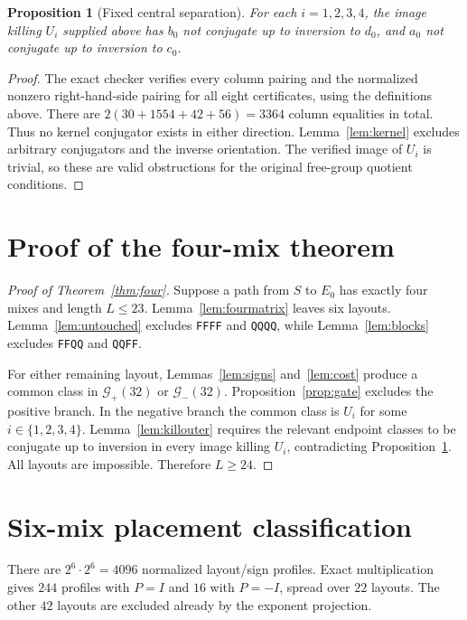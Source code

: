 \documentclass[11pt,a4paper]{article}
\newtheorem{proposition}[theorem]{Proposition}
\theoremstyle{definition}\newtheorem{definition}[theorem]{Definition}
\theoremstyle{remark}\newtheorem{remark}[theorem]{Remark}
\newcommand{\word}[1]{\texttt{#1}}
\begin{document}
\begin{proposition}[Fixed central separation]\label{prop:central}
For each $i=1,2,3,4$, the image killing $U_i$ supplied above has $b_0$ not conjugate up to inversion to $d_0$, and $a_0$ not conjugate up to inversion to $c_0$.
\end{proposition}
\begin{proof}
The exact checker verifies every column pairing and the normalized nonzero right-hand-side pairing for all eight certificates, using the definitions above. There are $2(30+1554+42+56)=3364$ column equalities in total. Thus no kernel conjugator exists in either direction. Lemma~\ref{lem:kernel} excludes arbitrary conjugators and the inverse orientation. The verified image of $U_i$ is trivial, so these are valid obstructions for the original free-group quotient conditions.
\end{proof}

\section{Proof of the four-mix theorem}\label{sec:fourproof}
\begin{proof}[Proof of Theorem~\ref{thm:four}]
Suppose a path from $S$ to $E_0$ has exactly four mixes and length $L\le23$. Lemma~\ref{lem:fourmatrix} leaves six layouts. Lemma~\ref{lem:untouched} excludes \word{FFFF} and \word{QQQQ}, while Lemma~\ref{lem:blocks} excludes \word{FFQQ} and \word{QQFF}.

For either remaining layout, Lemmas~\ref{lem:signs} and~\ref{lem:cost} produce a common class in $\mathcal G_+(32)$ or $\mathcal G_-(32)$. Proposition~\ref{prop:gate} excludes the positive branch. In the negative branch the common class is $U_i$ for some $i\in\{1,2,3,4\}$. Lemma~\ref{lem:killouter} requires the relevant endpoint classes to be conjugate up to inversion in every image killing $U_i$, contradicting Proposition~\ref{prop:central}. All layouts are impossible. Therefore $L\ge24$.
\end{proof}

\section{Six-mix placement classification}\label{sec:sixproof}
There are $2^6\cdot2^6=4096$ normalized layout/sign profiles. Exact multiplication gives $244$ profiles with $P=I$ and $16$ with $P=-I$, spread over $22$ layouts. The other $42$ layouts are excluded already by the exponent projection.
\end{document}
